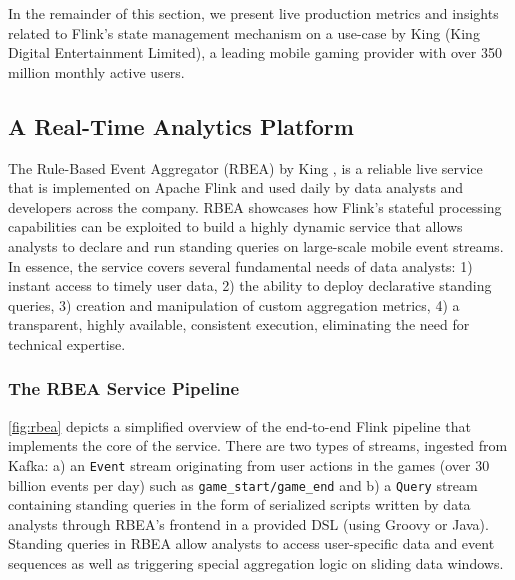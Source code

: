 In the remainder of this section, we present live production metrics and insights related to Flink's state management mechanism on a use-case by King (King Digital Entertainment Limited), a leading mobile gaming provider with over 350 million monthly active users.

\subsection{A Real-Time Analytics Platform}

The Rule-Based Event Aggregator (RBEA) by King \cite{CUSTOM:web/kingrbea}, is a reliable live service that is implemented on Apache Flink and used daily by data analysts and developers across the company. RBEA showcases how Flink's stateful processing capabilities can be exploited to build a highly dynamic service that allows analysts to declare and run standing queries on large-scale mobile event streams. In essence, the service covers several fundamental needs of data analysts: 1) instant access to timely user data, 2) the ability to deploy declarative standing queries, 3) creation and manipulation of custom aggregation metrics, 4) a transparent, highly available, consistent execution, eliminating the need for technical expertise.

\subsubsection{The RBEA Service Pipeline}
\autoref{fig:rbea} depicts a simplified overview of the end-to-end Flink pipeline that implements the core of the service. There are two types of streams, ingested from Kafka: a) an \texttt{Event} stream originating from  user actions in the games (over 30 billion events per day) such as \texttt{game\_start/game\_end} and b) a \texttt{Query} stream containing standing queries in the form of serialized scripts written by data analysts through RBEA's frontend in a provided DSL (using Groovy or Java). Standing queries in RBEA allow analysts to access user-specific data and event sequences as well as triggering special aggregation logic on sliding data windows. %

